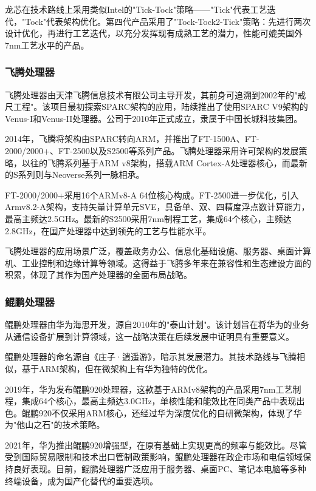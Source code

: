\documentclass[a4paper,colorlinks=true,linkcolor=blue,urlcolor=blue,citecolor=green,bookmarks=true]{article}
\begin{document}
龙芯在技术路线上采用类似Intel的"Tick-Tock"策略——"Tick"代表工艺迭代，"Tock"代表架构优化。第四代产品采用了"Tock-Tock2-Tick"策略：先进行两次设计优化，再进行工艺迭代，以充分发挥现有成熟工艺的潜力，性能可媲美国外7nm工艺水平的产品\cite{6}\cite{10}\cite{12}\cite{13}。

\subsubsection{飞腾处理器}

飞腾处理器由天津飞腾信息技术有限公司主导开发，其前身可追溯到2002年的"戒尺工程"。该项目最初探索SPARC架构的应用，陆续推出了使用SPARC V9架构的Venus-I和Venus-II处理器。公司于2010年正式成立，隶属于中国长城科技集团。

2014年，飞腾将架构由SPARC转向ARM，并推出了FT-1500A、FT-2000/2000+、FT-2500以及S2500等系列产品。飞腾处理器采用许可架构的发展策略，以往的飞腾系列基于ARM v8架构，搭载ARM Cortex-A处理器核心，而最新的S系列则与Neoverse系列一脉相承\cite{9}\cite{10}\cite{11}\cite{12}。

FT-2000/2000+采用16个ARMv8-A 64位核心构成。FT-2500进一步优化，引入Armv8.2-A架构，支持矢量计算单元SVE，具备单、双、四精度浮点数计算能力，最高主频达2.5GHz。最新的S2500采用7nm制程工艺，集成64个核心，主频达2.8GHz，在国产处理器中达到领先的工艺与性能水平\cite{9}\cite{10}\cite{11}\cite{12}\cite{13}。

飞腾处理器的应用场景广泛，覆盖政务办公、信息化基础设施、服务器、桌面计算机、工业控制和边缘计算等领域。这得益于飞腾多年来在兼容性和生态建设方面的积累，体现了其作为国产处理器的全面布局战略\cite{9}\cite{10}\cite{11}\cite{12}\cite{13}。

\subsubsection{鲲鹏处理器}

鲲鹏处理器由华为海思开发，源自2010年的"泰山计划"。该计划旨在将华为的业务从通信设备扩展到计算领域，这一战略决策在后续发展中证明具有重要意义。

鲲鹏处理器的命名源自《庄子·逍遥游》，暗示其发展潜力。其技术路线与飞腾相似，基于ARM架构，但在微架构上有华为独特的优化。

2019年，华为发布鲲鹏920处理器，这款基于ARMv8架构的产品采用7nm工艺制程，集成64个核心，最高主频达3.0GHz，单核性能和能效比在同类产品中表现出色。鲲鹏920不仅采用ARM核心，还经过华为深度优化的自研微架构，体现了华为"他山之石"的技术策略\cite{9}\cite{10}\cite{11}\cite{12}\cite{13}。

2021年，华为推出鲲鹏920增强型，在原有基础上实现更高的频率与能效比。尽管受到国际贸易限制和技术出口管制政策影响，鲲鹏处理器在政企市场和电信领域保持良好表现。目前，鲲鹏处理器广泛应用于服务器、桌面PC、笔记本电脑等多种终端设备，成为国产化替代的重要选项\cite{9}\cite{10}\cite{11}\cite{12}\cite{13}。
\end{document}
